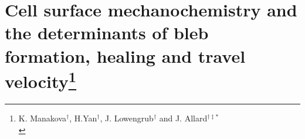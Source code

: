\renewcommand{\thefootnote}{$\star$} 
\chapter[Cellular blebs]{Cell surface mechanochemistry and the determinants of bleb formation, healing and travel velocity\footnote{K. Manakova$^\dag$, H.Yan$^\dag$, J. Lowengrub$^\dag$ and J. Allard$^{\dag\ddag\ast}$\\
}}












